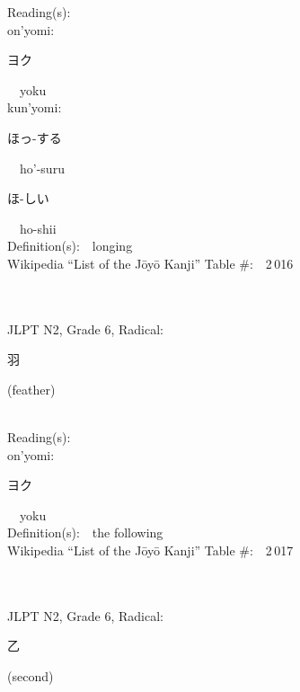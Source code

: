 \begin{multicols}{2}
Reading(s):\ \ \\
{\hspace*{1em}}on'yomi:\ \ \\
{\hspace*{2em}}{\begin{CJK}{UTF8}{min} ヨク \end{CJK}}\ \ yoku\ \ \\
{\hspace*{1em}}kun'yomi:\ \ \\
{\hspace*{2em}}{\begin{CJK}{UTF8}{min} ほっ-する \end{CJK}}\ \ ho'-suru\ \ \\
{\hspace*{2em}}{\begin{CJK}{UTF8}{min} ほ-しい \end{CJK}}\ \ ho-shii\ \ \\
Definition(s):\ \ longing \\
Wikipedia ``List of the J\=oy\=o Kanji'' Table \#:\ \ 2\,016 \\
\ \ \\
{\fontsize{34pt}{40pt}  }\ \ \\  %
{JLPT N2, Grade 6, Radical:\ \ {\begin{CJK}{UTF8}{min} 羽 \end{CJK}} (feather) } \\
Reading(s):\ \ \\
{\hspace*{1em}}on'yomi:\ \ \\
{\hspace*{2em}}{\begin{CJK}{UTF8}{min} ヨク \end{CJK}}\ \ yoku\ \ \\
Definition(s):\ \ the following \\
Wikipedia ``List of the J\=oy\=o Kanji'' Table \#:\ \ 2\,017 \\
\ \ \\
{\fontsize{34pt}{40pt}  }\ \ \\  %
{JLPT N2, Grade 6, Radical:\ \ {\begin{CJK}{UTF8}{min} 乙 \end{CJK}} (second) } \\

\end{multicols}
